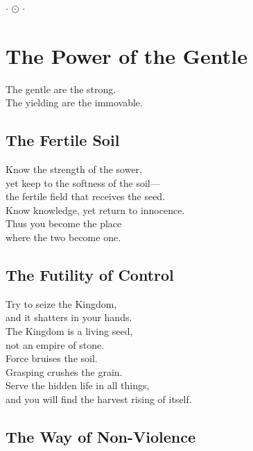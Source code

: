 \documentclass[10pt, openright]{book}
\newcommand{\sectionbreak}{\filbreak}
\newcommand{\sayingsource}[1]{\par\nopagebreak\vspace{0.3\baselineskip}{\raggedleft\footnotesize\itshape #1\par}}
\newcommand{\ornament}{
    \vspace{1.5cm}
    \begin{center}
        \large \(\cdot\) \(\odot\) \(\cdot\)
    \end{center}
    \vspace{1.5cm}
}
\begin{document}
\sayingsource{Tao Te Ching 27}

\ornament

\chapter{The Power of the Gentle}\label{the-power-of-the-gentle}

\begin{center}
The gentle are the strong.\\
The yielding are the immovable.
\end{center}

\sectionbreak

\section{The Fertile Soil}\label{the-fertile-soil}

Know the strength of the sower,\\
yet keep to the softness of the soil---\\
the fertile field that receives the seed.\\
Know knowledge, yet return to innocence.\\
Thus you become the place\\
where the two become one.

\sayingsource{Tao Te Ching 28 · Matthew 13:3--9}

\sectionbreak

\section{The Futility of Control}\label{the-futility-of-control}

Try to seize the Kingdom,\\
and it shatters in your hands.\\
The Kingdom is a living seed,\\
not an empire of stone.\\
Force bruises the soil.\\
Grasping crushes the grain.\\
Serve the hidden life in all things,\\
and you will find the harvest rising of itself.

\sayingsource{Tao Te Ching 29 · Mark 4:26--29}

\sectionbreak

\section{The Way of Non-Violence}\label{the-way-of-non-violence}
\end{document}

